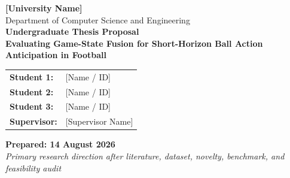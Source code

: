 \documentclass[11pt,a4paper]{article}
\begin{document}
\begin{titlepage}
\centering
\vspace*{1.0cm}
{\Large \textbf{[University Name]}}\\[0.35cm]
{\large Department of Computer Science and Engineering}\\[1.5cm]

{\LARGE \textbf{Undergraduate Thesis Proposal}}\\[0.8cm]
{\huge \textbf{Evaluating Game-State Fusion for Short-Horizon Ball Action Anticipation in Football}}\\[1.2cm]

\begin{tabular}{ll}
\textbf{Student 1:} & [Name / ID] \\
\textbf{Student 2:} & [Name / ID] \\
\textbf{Student 3:} & [Name / ID] \\
\textbf{Supervisor:} & [Supervisor Name] \\
\end{tabular}

\vfill
\textbf{Prepared: 14 August 2026}\\[0.3cm]
\textit{Primary research direction after literature, dataset, novelty, benchmark, and feasibility audit}
\end{titlepage}

\begin{abstract}
Ball Action Anticipation (BAA) asks a model to predict which ball-related football actions will occur and when they will occur in a short unobserved future interval. Existing BAA work is primarily driven by visual representations, while separate football action-detection and spotting research has shown that explicit game-state information such as player position, velocity, team relation, and multi-player interaction can complement visual evidence when the target action is already observable. This proposal investigates whether that structured information remains useful when the action must be predicted before it occurs.

The proposed study derives a reproducible BAA protocol from SoccerTrack v2, a public dataset containing full-pitch panoramic video, dense game-state reconstruction (GSR), and ball-action spotting (BAS) annotations. The research compares visual-only, game-state-only, simple fusion, flat-relational, and relation-aware fusion models under strict match-level evaluation. The implementation is designed for limited compute: multi-gigabyte GSR JSON files are streamed once into compact state tensors, 4K video is sampled once through a frozen visual encoder, and normal training operates only on compact features. Before full-scale paid compute is used, a 10-minute mini-pilot will validate the entire raw-data-to-prediction pipeline and measure actual resource consumption. The central contribution is therefore a controlled empirical answer to whether explicit player-level game state provides complementary predictive value for short-horizon football action anticipation.
\end{abstract}
\end{document}
